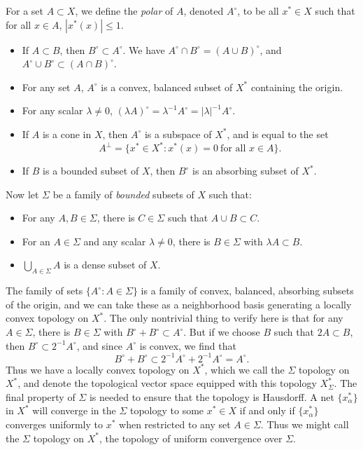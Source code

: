 For a set $A \subset X$, we define the \emph{polar} of $A$, denoted $A^\circ$, to be all $x^* \in X$ such that for all $x \in A$, $|x^*(x)| \leq 1$.
%
\begin{itemize}
    \item If $A \subset B$, then $B^\circ \subset A^\circ$. We have $A^\circ \cap B^\circ = (A \cup B)^\circ$, and $A^\circ \cup B^\circ \subset (A \cap B)^\circ$.
    \item For any set $A$, $A^\circ$ is a convex, balanced subset of $X^*$ containing the origin.
    \item For any scalar $\lambda \neq 0$, $(\lambda A)^\circ = \lambda^{-1} A^\circ = |\lambda|^{-1} A^\circ$.
    \item If $A$ is a cone in $X$, then $A^\circ$ is a subspace of $X^*$, and is equal to the set
    \[ A^\perp = \{ x^* \in X^*: x^*(x) = 0\ \text{for all $x \in A$} \}. \]
    \item If $B$ is a bounded subset of $X$, then $B^\circ$ is an absorbing subset of $X^*$.
\end{itemize}
%
Now let $\Sigma$ be a family of \emph{bounded} subsets of $X$ such that:
%
\begin{itemize}
    \item For any $A,B \in \Sigma$, there is $C \in \Sigma$ such that $A \cup B \subset C$.
    \item For an $A \in \Sigma$ and any scalar $\lambda \neq 0$, there is $B \in \Sigma$ with $\lambda A \subset B$.
    \item $\bigcup_{A \in \Sigma} A$ is a dense subset of $X$.
\end{itemize}
%
The family of sets $\{ A^\circ : A \in \Sigma \}$ is a family of convex, balanced, absorbing subsets of the origin, and we can take these as a neighborhood basis generating a locally convex topology on $X^*$. The only nontrivial thing to verify here is that for any $A \in \Sigma$, there is $B \in \Sigma$ with $B^\circ + B^\circ \subset A^\circ$. But if we choose $B$ such that $2 A \subset B$, then $B^\circ \subset 2^{-1} A^\circ$, and since $A^\circ$ is convex, we find that
%
\[ B^\circ + B^\circ \subset 2^{-1} A^\circ + 2^{-1} A^\circ = A^\circ. \]
%
Thus we have a locally convex topology on $X^*$, which we call the $\Sigma$ topology on $X^*$, and denote the topological vector space equipped with this topology $X^*_\Sigma$. The final property of $\Sigma$ is needed to ensure that the topology is Hausdorff. A net $\{ x_\alpha^* \}$ in $X^*$ will converge in the $\Sigma$ topology to some $x^* \in X$ if and only if $\{ x_\alpha^* \}$ converges uniformly to $x^*$ when restricted to any set $A \in \Sigma$. Thus we might call the $\Sigma$ topology on $X^*$, the topology of uniform convergence over $\Sigma$.

